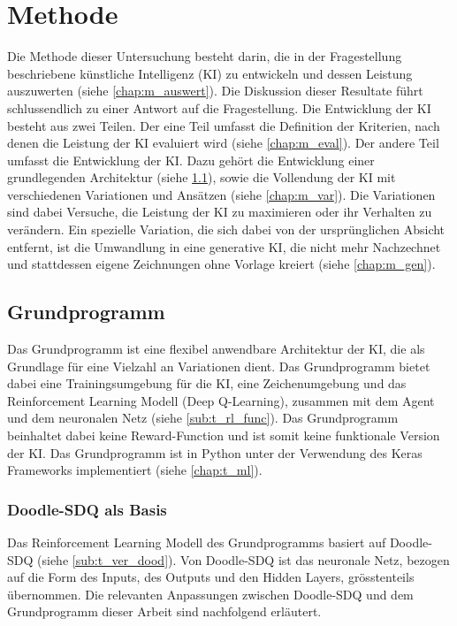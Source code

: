 \chapter{Methode}\label{chap:m} Die Methode dieser Untersuchung besteht darin,
die in der Fragestellung beschriebene künstliche Intelligenz (KI) zu entwickeln
und dessen Leistung auszuwerten (siehe \ref{chap:m_auswert}). Die
Diskussion dieser Resultate führt schlussendlich zu einer Antwort auf die
Fragestellung. Die Entwicklung der KI besteht aus zwei Teilen. Der eine Teil
umfasst die Definition der Kriterien, nach denen die Leistung der KI evaluiert
wird (siehe \ref{chap:m_eval}). Der andere Teil umfasst die Entwicklung
der KI. Dazu gehört die Entwicklung einer grundlegenden Architektur (siehe
\ref{chap:m_grund}), sowie die Vollendung der KI mit verschiedenen
Variationen und Ansätzen (siehe \ref{chap:m_var}). Die Variationen sind
dabei Versuche, die Leistung der KI zu maximieren oder ihr Verhalten zu
verändern. Ein spezielle Variation, die sich dabei von der ursprünglichen
Absicht entfernt, ist die Umwandlung in eine generative KI, die nicht mehr
Nachzechnet und stattdessen eigene Zeichnungen ohne Vorlage kreiert (siehe
\ref{chap:m_gen}).


\section{Grundprogramm}\label{chap:m_grund} Das Grundprogramm ist eine flexibel
anwendbare Architektur der KI, die als Grundlage für eine Vielzahl an
Variationen dient. Das Grundprogramm bietet dabei eine Trainingsumgebung für die
KI, eine Zeichenumgebung und das Reinforcement Learning Modell (Deep
Q-Learning), zusammen mit dem Agent und dem neuronalen Netz (siehe
\ref{sub:t_rl_func}). Das Grundprogramm beinhaltet dabei keine
Reward-Function und ist somit keine funktionale Version der KI.
Das Grundprogramm ist in Python unter der Verwendung des Keras
Frameworks implementiert (siehe \ref{chap:t_ml}).


\subsection{Doodle-SDQ als Basis}\label{sub:m_grund_dood} Das Reinforcement
Learning Modell des Grundprogramms basiert auf Doodle-SDQ (siehe
\ref{sub:t_ver_dood}). Von Doodle-SDQ ist das neuronale Netz, bezogen auf
die Form des Inputs, des Outputs und den Hidden Layers, grösstenteils
übernommen. Die relevanten Anpassungen zwischen Doodle-SDQ und dem Grundprogramm
dieser Arbeit sind nachfolgend erläutert.
 
